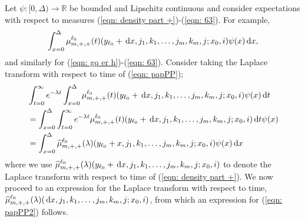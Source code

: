 Let \(\psi:[0,\Delta)\to\mathbb R\) be bounded and Lipschitz continuous and consider expectations with respect to measures (\ref{eqn: density part +})-(\ref{eqn: 63}). For example, 
\begin{align}
	\int_{x=0}^\Delta \mu^{\ell_0}_{m,+,+}(t)( y_{\ell_0} + \, \mathrm{d} x, j_1,k_1,\dots,j_m,k_m, j; x_0,i) \psi(x)\, \mathrm{d} x, \label{eqn: papPP}
\end{align}
and similarly for (\ref{eqn: gq er h})-(\ref{eqn: 63}). Consider taking the Laplace transform with respect to time of (\ref{eqn: papPP});
\begin{align}
	&\int_{t=0}^\infty e^{-\lambda t}\int_{x=0}^\Delta \mu^{\ell_0}_{m,+,+}(t)( y_{\ell_0} + \, \mathrm{d} x, j_1,k_1,\dots,j_m,k_m, j; x_0,i) \psi(x) \, \mathrm{d} t \nonumber 
	\\&= \int_{x=0}^\Delta \int_{t=0}^\infty e^{-\lambda t} \mu^{\ell_0}_{m,+,+}(t)( y_{\ell_0} + \, \mathrm{d} x, j_1,k_1,\dots,j_m,k_m, j; x_0,i)  \, \mathrm{d} t \psi(x) \nonumber 
	\\&= \int_{x=0}^\Delta \widehat \mu^{\ell_0}_{m,+,+}(\lambda)( y_{\ell_0} + x, j_1,k_1,\dots,j_m,k_m, j; x_0,i) \psi(x) \, \mathrm{d} x \label{eqn: papPP2}
\end{align}
where we use \(\widehat \mu^{\ell_0}_{m,+,+}(\lambda)( y_{\ell_0} + \, \mathrm{d} x, j_1,k_1,\dots,j_m,k_m, j; x_0,i) \) to denote the Laplace transform with respect to time of (\ref{eqn: density part +}). We now proceed to an expression for the Laplace transform with respect to time, \(\widehat \mu^{\ell_0}_{m,+,+}(\lambda)( \, \mathrm{d} x, j_1,k_1,\dots,j_m,k_m, j; x_0,i) \), from which an expression for (\ref{eqn: papPP2}) follows. 

